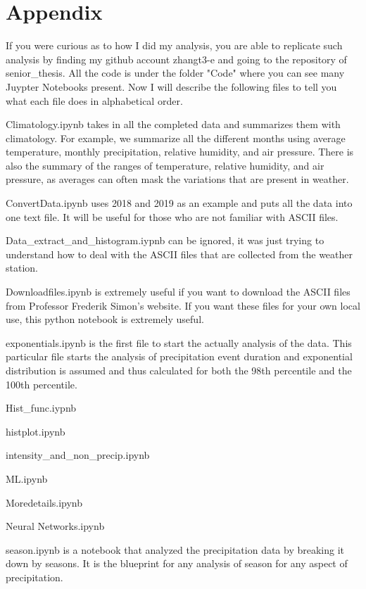 \documentclass[11pt]{report}
\begin{document}
\renewcommand{\bibname}{References}



\clearpage
\section{Appendix} 
If you were curious as to how I did my analysis, you are able to replicate such analysis by finding my github account zhangt3-e and going to the repository of senior\_thesis. All the code is under the folder "Code" where you can see many Juypter Notebooks present. Now I will describe the following files to tell you what each file does in alphabetical order. 

Climatology.ipynb takes in all the completed data and summarizes them with climatology. For example, we summarize all the different months using average temperature, monthly precipitation, relative humidity, and air pressure. There is also the summary of the ranges of temperature, relative humidity, and air pressure, as averages can often mask the variations that are present in weather. 

ConvertData.ipynb uses 2018 and 2019 as an example and puts all the data into one text file. It will be useful for those who are not familiar with ASCII files. 

Data\_extract\_and\_histogram.iypnb can be ignored, it was just trying to understand how to deal with the ASCII files that are collected from the weather station. 

Downloadfiles.ipynb is extremely useful if you want to download the ASCII files from Professor Frederik Simon's website. If you want these files for your own local use, this python notebook is extremely useful. 

exponentials.ipynb is the first file to start the actually analysis of the data. This particular file starts the analysis of precipitation event duration and exponential distribution is assumed and thus calculated for both the 98th percentile and the 100th percentile. 

Hist\_func.iypnb 

histplot.ipynb 

intensity\_and\_non\_precip.ipynb 

ML.ipynb 

Moredetails.ipynb 

Neural Networks.ipynb 

season.ipynb is a notebook that analyzed the precipitation data by breaking it down by seasons. It is the blueprint for any analysis of season for any aspect of precipitation. 
\end{document}
